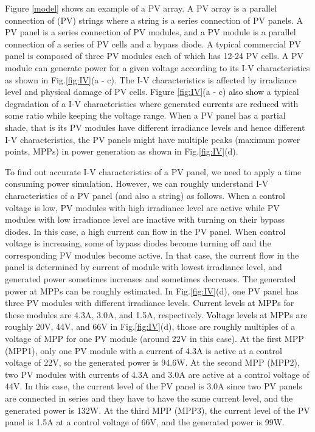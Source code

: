 \documentclass[conference]{pvsctran}
\newcommand{\michiko}{\textcolor{black}}
\begin{document}
Figure \ref{model} shows an example of a PV array. 
A PV array is a parallel connection of (PV) strings where a string is a series connection of PV panels. 
A PV panel is a series connection of PV modules, and a PV module is a parallel connection of a series of PV cells and a bypass diode. 
A typical commercial PV panel is composed of three PV modules each of which has 12-24 PV cells. 
A PV module can generate power for a given voltage according to its I-V characteristics as shown in Fig.\ref{fig:IV}(a - c). 
The I-V characteristics is affected by irradiance level and physical damage of PV cells. 
\michiko{Figure \ref{fig:IV}(a - c) also show} a typical degradation of a I-V characteristics where generated \michiko{currents are reduced} with some ratio while keeping the voltage range. 
When a PV panel has a partial shade, that is its PV modules have different irradiance levels and hence different I-V characteristics, the PV panels might have multiple peaks (maximum power points, MPPs) in power generation as shown in Fig.\ref{fig:IV}(d). 

To find out accurate I-V characteristics of a PV panel, we need to apply a time consuming power simulation. 
However, we can roughly understand I-V characteristics of a PV panel (and also a string) as follows. 
When a control voltage is low, PV modules with high irradiance level are active while PV modules with low irradiance level are inactive with turning on their bypass diodes.
In this case, a high current can flow in the PV panel. When control voltage is increasing, some of bypass diodes become turning off and the corresponding PV modules become active. 
In that case, the current flow in the panel is determined by current of module with lowest irradiance level, and generated power sometimes increases and sometimes decreases.
The generated power at MPPs can be roughly estimated. 
In Fig.\ref{fig:IV}(d), one PV panel has three PV modules with different irradiance levels. 
\michiko{Current levels at MPPs} for these modules are 4.3A, 3.0A, and 1.5A, respectively. 
\michiko{Voltage levels} at MPPs are roughly 20V, 44V, \michiko{and} 66V in Fig.\ref{fig:IV}(d), those are roughly multiples of a voltage of MPP for one PV module (around 22V in this case). 
At the first MPP (MPP1), only one PV module with \michiko{a current of 4.3A} is active at a control voltage of 22V, so the generated power is 94.6W. 
At the second MPP (MPP2), two PV modules with currents of 4.3A and 3.0A are active at a control voltage of 44V. 
In this case, the current level of the PV panel is 3.0A since two PV panels are connected in series and they have to have the same current level, and the generated power is 132W.
At the third MPP (MPP3), the current level of the PV panel is 1.5A at a control voltage of 66V, and the generated power is 99W. 
\end{document}
